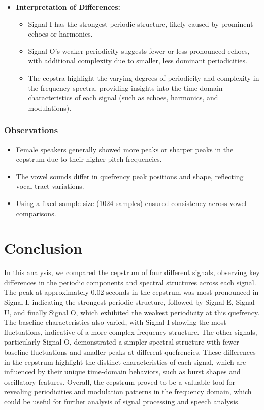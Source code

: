 \documentclass[a4paper,12pt]{article}
\begin{document}
\begin{itemize}
    \item \textbf{Interpretation of Differences:}
    \begin{itemize}
        \item Signal I has the strongest periodic structure, likely caused by prominent echoes or harmonics.
        \item Signal O's weaker periodicity suggests fewer or less pronounced echoes, with additional complexity due to smaller, less dominant periodicities.
        \item The cepstra highlight the varying degrees of periodicity and complexity in the frequency spectra, providing insights into the time-domain characteristics of each signal (such as echoes, harmonics, and modulations).
    \end{itemize}
\end{itemize}

\subsubsection{Observations}
\begin{itemize}
    \item Female speakers generally showed more peaks or sharper peaks in the cepstrum due to their higher pitch frequencies.
    \item The vowel sounds differ in quefrency peak positions and shape, reflecting vocal tract variations.
    \item Using a fixed sample size (1024 samples) ensured consistency across vowel comparisons.
\end{itemize}
\section{Conclusion}
In this analysis, we compared the cepstrum of four different signals, observing key differences in the periodic components and spectral structures across each signal. The peak at approximately 0.02 seconds in the cepstrum was most pronounced in Signal I, indicating the strongest periodic structure, followed by Signal E, Signal U, and finally Signal O, which exhibited the weakest periodicity at this quefrency. The baseline characteristics also varied, with Signal I showing the most fluctuations, indicative of a more complex frequency structure. The other signals, particularly Signal O, demonstrated a simpler spectral structure with fewer baseline fluctuations and smaller peaks at different quefrencies. These differences in the cepstrum highlight the distinct characteristics of each signal, which are influenced by their unique time-domain behaviors, such as burst shapes and oscillatory features. Overall, the cepstrum proved to be a valuable tool for revealing periodicities and modulation patterns in the frequency domain, which could be useful for further analysis of signal processing and speech analysis.
\end{document}
